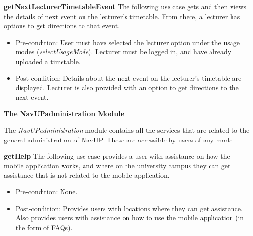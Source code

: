 \documentclass[12pt,a4paper]{article}
\begin{document}

	    \textbf{getNextLecturerTimetableEvent}
		The following use case gets and then views the details of next event on the lecturer's timetable. From there, a 			    lecturer has options to get directions to that event.

		\begin{itemize}
		  \item Pre-condition: User must have selected the lecturer option under the usage modes (\textit{selectUsageMode}). 		            Lecturer must be logged in, and have already uploaded a timetable.
		   \item Post-condition: Details about the next event on the lecturer's timetable are displayed. Lecturer is also 						 provided with an option to get directions to the next event.
		\end{itemize}

		\textbf{The NavUPadministration Module} \newline

		The \textit{NavUPadministration} module contains all the services that are related to the general administration of 			NavUP. These are accessible by users of any mode.

	    \medskip

	    \textbf{getHelp}
		The following use case provides a user with assistance on how the mobile application works, and where on the 				    university campus they can get assistance that is not related to the mobile application.

		\begin{itemize}
		  \item Pre-condition: None.
		   \item Post-condition: Provides users with locations where they can get assistance. Also provides users with 		  		             assistance on how to use the mobile application (in the form of FAQs).
		\end{itemize}


\end{document}
\end{itemize}
\end{document}
